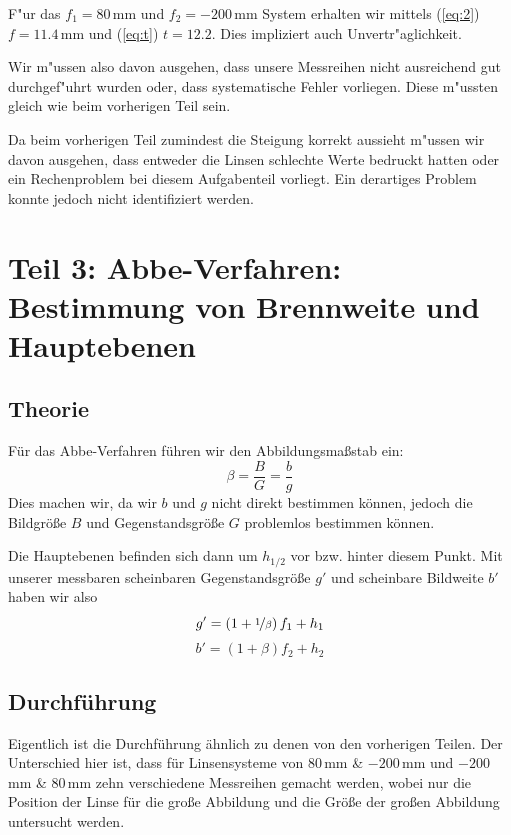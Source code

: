 \documentclass[11pt,a4paper]{article}
\begin{document}
F"ur das $f_1=80\,$mm und $f_2=-200\,$mm System erhalten wir mittels (\ref{eq:2}) $f=11.4\,$mm und (\ref{eq:t}) $t=12.2$. Dies impliziert auch Unvertr"aglichkeit.

Wir m"ussen also davon ausgehen, dass unsere Messreihen nicht ausreichend gut durchgef"uhrt wurden oder, dass systematische Fehler vorliegen. Diese m"ussten gleich wie beim vorherigen Teil sein.

Da beim vorherigen Teil zumindest die Steigung korrekt aussieht m"ussen wir davon ausgehen, dass entweder die Linsen schlechte Werte bedruckt hatten oder ein Rechenproblem bei diesem Aufgabenteil vorliegt. Ein derartiges Problem konnte jedoch nicht identifiziert werden.

\section{Teil 3: Abbe-Verfahren: Bestimmung von Brennweite und Hauptebenen}

\subsection{Theorie}

F\"ur das Abbe-Verfahren f\"uhren wir den Abbildungsma\ss stab ein:
\begin{equation}
\beta=\frac{B}{G}=\frac{b}{g}\label{eq:4}
\end{equation}
Dies machen wir, da wir $b$ und $g$ nicht direkt bestimmen k\"onnen, jedoch die Bildgr\"o\ss e $B$ und Gegenstandsgr\"o\ss e $G$ problemlos bestimmen k\"onnen.

Die Hauptebenen befinden sich dann um $h_{1/2}$ vor bzw. hinter diesem Punkt. Mit unserer messbaren scheinbaren Gegenstandsgr\"o\ss e $g'$ und scheinbare Bildweite $b'$ haben wir also
\begin{equation}
g'=\left(1+\nicefrac{1}{\beta}\right)f_1+h_1\label{eq:5}
\end{equation}
\begin{equation}
b'=\left(1+\beta\right)f_2+h_2\label{eq:6}
\end{equation}

\subsection{Durchführung}

Eigentlich ist die Durchf\"uhrung \"ahnlich zu denen von den vorherigen Teilen. Der Unterschied hier ist, dass f\"ur Linsensysteme von 80\,mm \& $-200$\,mm und $-200$\,mm \& 80\,mm zehn verschiedene Messreihen gemacht werden, wobei nur die Position der Linse f\"ur die gro\ss e Abbildung und die Gr\"o\ss e der gro\ss en Abbildung untersucht werden.
\end{document}
